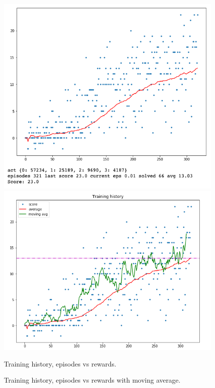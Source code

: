 \documentclass{article}
\begin{document}
\begin{figure}[ht!]
    \includegraphics[scale=0.3]{training}\hfill
    \includegraphics[scale=0.35]{training2}\hfill
    \caption{Training history, episodes vs rewards.}
    \caption{Training history, episodes vs rewards with moving average.}
\end{figure}
\end{document}
